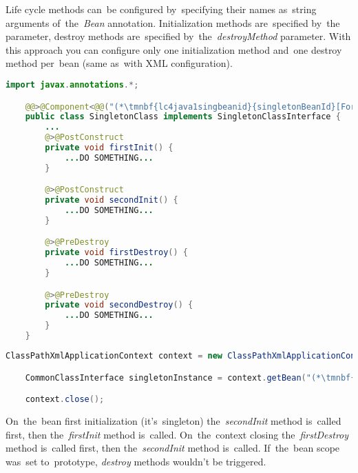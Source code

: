 Life cycle methods can~be configured by~specifying their names as~string arguments of~the~\textit{Bean} annotation.
Initialization methods are~specified by~the~ parameter, destroy methods are~specified by~the~\textit{destroyMethod} parameter.
With this approach you can configure only one initialization method and~one destroy method per~bean (same as~with XML configuration).
\newpage

\begin{lstlisting}[language=Java, title={Singleton bean class with multiple life cycle methods}]
    import javax.annotations.*;

    @@>@Component<@@("(*\tmnbf{lc4java1singbeanid}{singletonBeanId}[ForestGreen]*)")
    public class SingletonClass implements SingletonClassInterface {
        ...
        @>@PostConstruct
        private void firstInit() {
            ...DO SOMETHING...
        }

        @>@PostConstruct
        private void secondInit() {
            ...DO SOMETHING...
        }

        @>@PreDestroy
        private void firstDestroy() {
            ...DO SOMETHING...
        }

        @>@PreDestroy
        private void secondDestroy() {
            ...DO SOMETHING...
        }
    }
\end{lstlisting}
\begin{lstlisting}[language=Java, title={Usage}]
    ClassPathXmlApplicationContext context = new ClassPathXmlApplicationContext("configurationFile.xml");

    CommonClassInterface singletonInstance = context.getBean("(*\tmnbf{lc4java2singbeanid}{singletonBeanId}[ForestGreen]*)", SingletonClassInterface.class);

    context.close();
\end{lstlisting}

\noindent On~the~bean first initialization (it's~singleton) the~\textit{secondInit} method is~called first, then the~\textit{firstInit} method is~called.
On~the~context closing the~\textit{firstDestroy} method is~called first, then the~\textit{secondInit} method is~called.
If~the~bean scope was~set to~prototype, \textit{destroy} methods wouldn't be triggered.
\newpage

